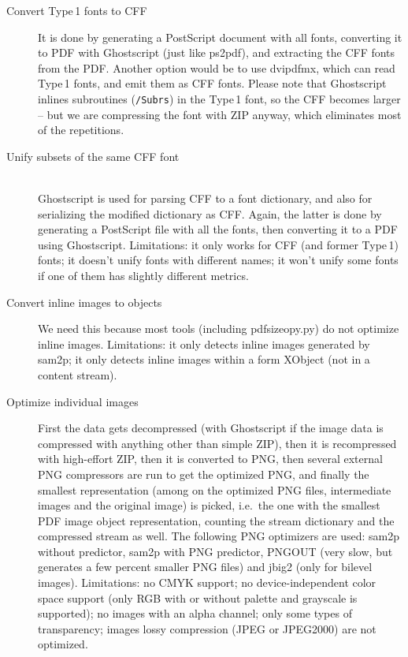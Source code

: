 \documentclass{ltugproc}
\def\cmd{\textsf}
\begin{document}
\begin{description}

\item[Convert Type\,1 fonts to CFF]
It is done by generating a PostScript document with all
fonts, converting it to PDF with Ghostscript (just like \cmd{ps2pdf}),
and extracting the CFF fonts from the PDF. Another option would be to use
\cmd{dvipdfmx}, which can read Type\,1 fonts, and emit them as CFF fonts.
Please note that Ghostscript inlines subroutines (\texttt{/Subrs}) in the
Type\,1 font, so the CFF becomes larger -- but we are compressing the font
with ZIP anyway, which eliminates most of the repetitions.

\item[Unify subsets of the same CFF font]
~\\ %
Ghost\-script is used for parsing CFF to a font dictionary,
and also for serializing the modified dictionary as CFF. Again, the latter is
done by generating a PostScript file with all the fonts, then converting it
to a PDF using Ghostscript.
Limitations: it only works for CFF (and former Type\,1) fonts;
it doesn't unify fonts with different names;
it won't unify some fonts if one of them has slightly different
metrics.

\item[Convert inline images to objects]
We need this because most tools (including \cmd{pdfsizeopy.py})
do not optimize inline images.
Limitations: it only detects inline images generated by \cmd{sam2p}; it only
detects inline images within a form XObject (not in a content stream).

\item[Optimize individual images]
First the data gets decompressed (with
Ghostscript if the image data is compressed with anything other than simple
ZIP), then it is recompressed with high-effort ZIP, then it is converted
to PNG, then several external PNG compressors are run to get the optimized
PNG, and finally the smallest representation (among on the optimized PNG
files, intermediate images and the original image) is picked, i.e.\ the one
with the smallest PDF image object representation, counting the stream
dictionary and the compressed stream as well. The following PNG optimizers
are used: \cmd{sam2p} without predictor, \cmd{sam2p} with PNG predictor,
PNGOUT (very slow, but generates a few percent smaller PNG files) and
\cmd{jbig2} (only for bilevel images).
Limitations: no CMYK support; no device-independent color space support
(only RGB with or without palette and grayscale is supported); no images with
an alpha channel; only some types of transparency; images lossy compression
(JPEG or JPEG2000) are not optimized.


\end{description}
\end{document}
